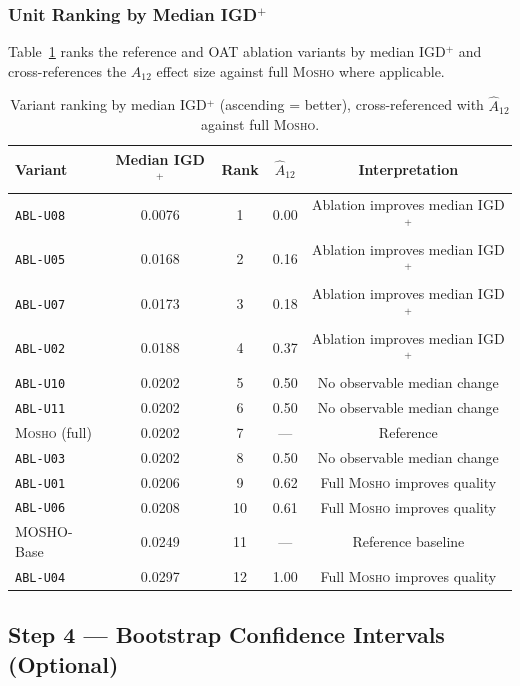 \documentclass[11pt,a4paper]{article}
\newcommand{\mosho}{\textsc{Mosho}}
\newcommand{\ablof}[1]{\texttt{ABL-#1}}
\begin{document}
\subsubsection{Unit Ranking by Median IGD$^+$}
\label{sec:stat_ranking}

Table~\ref{tab:ranking} ranks the reference and OAT ablation variants by
median IGD$^+$ and cross-references the $A_{12}$ effect size against full
\mosho{} where applicable.

\begin{table}[H]
\centering
\caption{Variant ranking by median IGD$^+$ (ascending = better),
  cross-referenced with $\hat{A}_{12}$ against full \mosho{}.}
\label{tab:ranking}
\renewcommand{\arraystretch}{1.2}
\setlength{\tabcolsep}{9pt}
\small
\begin{tabular}{l c c c c}
\toprule
\textbf{Variant} &
  \textbf{Median IGD}$^+$ &
  \textbf{Rank} &
  $\hat{A}_{12}$ &
  \textbf{Interpretation} \\
\midrule
\ablof{U08}     & 0.0076 & 1  & 0.00 & Ablation improves median IGD$^+$ \\
\ablof{U05}     & 0.0168 & 2  & 0.16 & Ablation improves median IGD$^+$ \\
\ablof{U07}     & 0.0173 & 3  & 0.18 & Ablation improves median IGD$^+$ \\
\ablof{U02}     & 0.0188 & 4  & 0.37 & Ablation improves median IGD$^+$ \\
\ablof{U10}     & 0.0202 & 5  & 0.50 & No observable median change \\
\ablof{U11}     & 0.0202 & 6  & 0.50 & No observable median change \\
\mosho{} (full) & 0.0202 & 7  & ---  & Reference \\
\ablof{U03}     & 0.0202 & 8  & 0.50 & No observable median change \\
\ablof{U01}     & 0.0206 & 9  & 0.62 & Full \mosho{} improves quality \\
\ablof{U06}     & 0.0208 & 10 & 0.61 & Full \mosho{} improves quality \\
MOSHO-Base      & 0.0249 & 11 & ---  & Reference baseline \\
\ablof{U04}     & 0.0297 & 12 & 1.00 & Full \mosho{} improves quality \\
\bottomrule
\end{tabular}
\end{table}

\subsection{Step 4 --- Bootstrap Confidence Intervals (Optional)}
\label{sec:stat_bootstrap}
\end{document}
